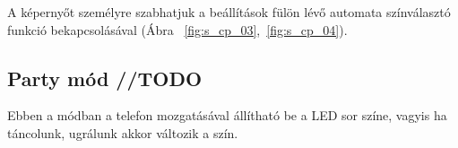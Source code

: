 \documentclass[../main.tex]{subfiles}
\begin{document}
            A képernyőt személyre szabhatjuk a beállítások fülön lévő automata színválasztó funkció bekapcsolásával (Ábra ~\ref{fig:s_cp_03},~\ref{fig:s_cp_04}).
            
            \begin{figure}[h!]
                \begin{floatrow}
                \end{floatrow}
            \end{figure}
        
        \subsection{Party mód //TODO}
            Ebben a módban a telefon mozgatásával állítható be a LED sor színe, vagyis ha táncolunk, ugrálunk akkor változik a szín. 
            
\end{document}
